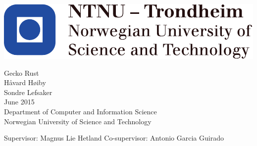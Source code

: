 
\thispagestyle{empty}
\includegraphics[scale=1.1]{figures/NTNU}
\mbox{}\\[6pc]
\begin{center}

\Huge{Gecko Rust}\\[2pc]

\Large{Håvard Høiby \\ Sondre Lefsaker}\\[1pc]
\large{June 2015}\\[2pc]

Department of Computer and Information Science\\
Norwegian University of Science and Technology
\end{center}
\vfill

\noindent Supervisor: Magnus Lie Hetland
\noindent Co-supervisor: Antonio Garcia Guirado
